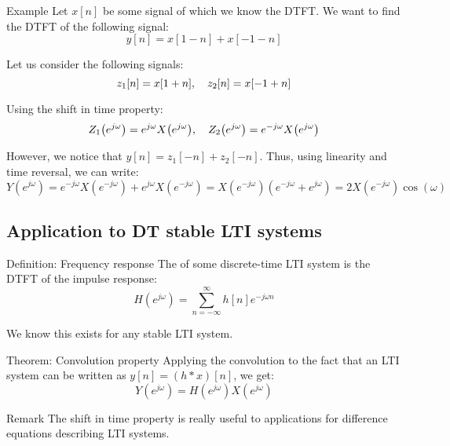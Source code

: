 \documentclass[a4paper]{article}
\begin{document}
\begin{parag}{Example}
    Let $x\left[n\right]$ be some signal of which we know the DTFT. We want to find the DTFT of the following signal: 
    \[y\left[n\right] = x\left[1 - n\right] + x\left[-1 -n\right]\]
    
    Let us consider the following signals: 
    \[z_1\left[n\right] = x\left[1 + n\right], \mathspace z_2\left[n\right] = x\left[-1 + n\right]\]
    
    Using the shift in time property: 
    \[Z_1\left(e^{j \omega}\right) = e^{j \omega}X\left(e^{j \omega}\right), \mathspace Z_2\left(e^{j\omega}\right) = e^{-j \omega} X\left(e^{j \omega}\right)\]
    
    However, we notice that $y\left[n\right] = z_1\left[-n\right] + z_{2}\left[-n\right]$. Thus, using linearity and time reversal, we can write: 
    \[Y\left(e^{j \omega}\right) = e^{-j \omega} X\left(e^{-j \omega}\right) + e^{j \omega} X\left(e^{-j \omega}\right) = X\left(e^{-j \omega}\right) \left(e^{-j \omega} + e^{j \omega}\right) = 2X\left(e^{-j \omega}\right) \cos\left(\omega\right)\]
\end{parag}

\subsection{Application to DT stable LTI systems}
\begin{parag}{Definition: Frequency response}
    The  of some discrete-time LTI system is the DTFT of the impulse response: 
    \[H\left(e^{j \omega}\right) = \sum_{n=-\infty}^{\infty} h\left[n\right] e^{-j \omega n}\]

    We know this exists for any stable LTI system.
\end{parag}

\begin{parag}{Theorem: Convolution property}
    Applying the convolution to the fact that an LTI system can be written as $y\left[n\right] = \left(h * x\right)\left[n\right]$, we get: 
    \[Y\left(e^{j \omega}\right) = H\left(e^{j\omega}\right) X\left(e^{j \omega}\right)\]
\end{parag}

\begin{parag}{Remark}
    The shift in time property is really useful to applications for difference equations describing LTI systems.
\end{parag}
\end{document}
